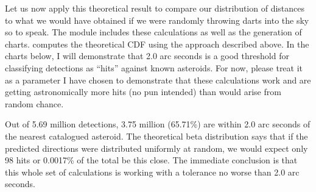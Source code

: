 Let us now apply this theoretical result to compare our distribution of distances to what we would have obtained if 
we were randomly throwing darts into the sky so to speak.
The module  includes these calculations as well as the generation of charts.
 computes the theoretical CDF using the approach described above.
In the charts below, I will demonstrate that 2.0 arc seconds is a good threshold for classifying detections as ``hits'' against known asteroids.
For now, please treat it as a parameter I have chosen to demonstrate that these calculations work and are getting
astronomically more hits (no pun intended) than would arise from random chance.

Out of 5.69 million detections, 3.75 million (65.71\%) are within 2.0 arc seconds of the nearest catalogued asteroid.
The theoretical beta distribution says that if the predicted directions were distributed uniformly at random,
we would expect only 98 hits or 0.0017\% of the total be this close.
The immediate conclusion is that this whole set of calculations is working with a tolerance no worse than 2.0 arc seconds.

